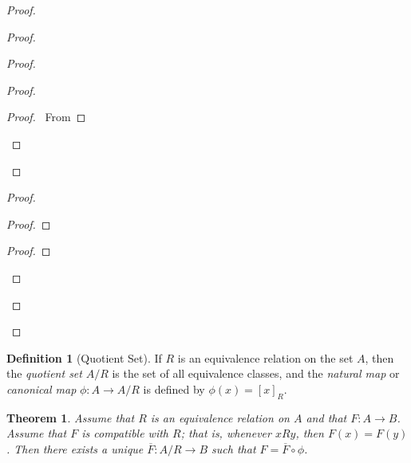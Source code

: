 \documentclass{report}
\let\qed\relax
\newtheorem{theorem}[axiom]{Theorem}
\theoremstyle{definition}
\newtheorem{definition}[axiom]{Definition}
\begin{document}
\begin{proof}
\begin{proof}
\begin{proof}
\begin{proof}
                    \begin{proof}
                        \pf\ From 
                    \end{proof}
                \end{proof}
            \end{proof}
            \begin{proof}
                \begin{proof}
                \end{proof}
                \begin{proof}
                \end{proof}
            \end{proof}
        \end{proof}
        \qed
    \end{proof}

    \begin{definition}[Quotient Set]
        If $R$ is an equivalence relation on the set $A$, then the \emph{quotient set} $A / R$
        is the set of all equivalence classes, and the \emph{natural map} or \emph{canonical map}
        $\phi : A \rightarrow A/R$ is defined by $\phi(x) = [x]_R$.
    \end{definition}

    \begin{theorem}
        Assume that $R$ is an equivalence relation on $A$ and that $F : A \rightarrow B$.
        Assume that $F$ is \emph{compatible} with $R$; that is, whenever $xRy$, then $F(x) = F(y)$.
        Then there exists a unique $\overline{F} : A / R \rightarrow B$ such that $F = \overline{F} \circ \phi$.
    \end{theorem}
\end{document}
